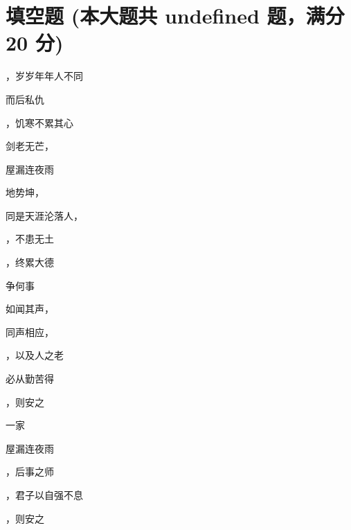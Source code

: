 \documentclass[12pt, a4paper, addpoints]{exam}
\begin{document}
\section{\normalsize{填空题 (本大题共 undefined 题，满分 20 分)}}
\hspace{1.5cm}
\begin{multicols}{2}
\begin{questions}
\question[1] \uline{\qquad\qquad\qquad}，岁岁年年人不同

\question[1] \uline{\qquad\qquad\qquad}而后私仇

\question[1] \uline{\qquad\qquad\qquad}，饥寒不累其心

\question[1] 剑老无芒，\uline{\qquad\qquad\qquad}

\question[1] 屋漏\uline{\qquad\qquad\qquad}连夜雨

\question[1] 地势坤，\uline{\qquad\qquad\qquad}

\question[1] 同是天涯沦落人，\uline{\qquad\qquad\qquad}

\question[1] \uline{\qquad\qquad\qquad}，不患无土

\question[1] \uline{\qquad\qquad\qquad}，终累大德

\question[1] \uline{\qquad\qquad\qquad}争何事

\question[1] 如闻其声，\uline{\qquad\qquad\qquad}

\question[1] 同声相应，\uline{\qquad\qquad\qquad}

\question[1] \uline{\qquad\qquad\qquad}，以及人之老

\question[1] \uline{\qquad\qquad\qquad}必从勤苦得

\question[1] \uline{\qquad\qquad\qquad}，则安之

\question[1] \uline{\qquad\qquad\qquad}一家

\question[1] 屋漏\uline{\qquad\qquad\qquad}连夜雨

\question[1] \uline{\qquad\qquad\qquad}，后事之师

\question[1] \uline{\qquad\qquad\qquad}，君子以自强不息

\question[1] \uline{\qquad\qquad\qquad}，则安之

\end{questions}
\end{multicols}
\end{document}
